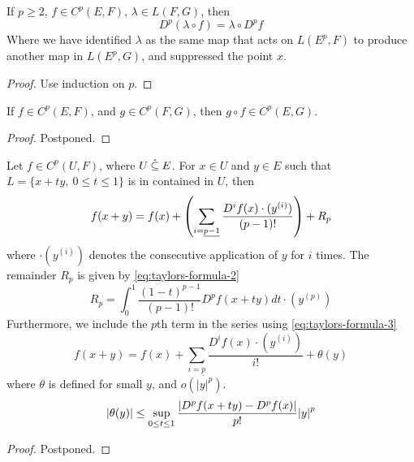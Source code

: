 \documentclass[../main-manifolds.tex]{subfiles}
\begin{document}
\begin{wts}\label{prop:linear-maps-commute-with-p-derivative}
    If $p\geq 2$, $f\in C^p(E,F)$, $\lambda\in L(F,G)$, then
    \[
        D^p(\lambda\circ f) = \lambda\circ D^pf
    \]
    Where we have identified $\lambda$ as the same map that acts on $L(E^p, F)$ to produce another map in $L(E^p, G)$, and suppressed the point $x$.
\end{wts}
\begin{proof}
    Use induction on $p$.
\end{proof}
\begin{wts}\label{prop:Cp-banach-closed-under-composition}
    If $f\in C^p(E,F)$, and $g\in C^p(F,G)$, then $g\circ f\in C^p(E,G)$.
\end{wts}
\begin{proof}
    Postponed.
\end{proof}
\begin{wts}\label{prop:taylors-formula}
    Let $f\in C^p(U, F)$, where $U\:\mathring{\subseteq}\: E$. For $x\in U$ and $y\in E$ such that $L = \{x + ty,\: 0\leq t\leq 1\}$ is in contained in $U$, then 
    \begin{equation}\label{eq:taylors-formula-1}
        f(x+y) = f(x) + \qty(\sum_{i=\underline{p-1}}\dfrac{D^if(x)\cdot (y^{(i)})}{(p-1)!}) + R_p
    \end{equation}
    where $\cdot (y^{(i)})$ denotes the consecutive application of $y$ for $i$ times. The remainder $R_p$ is given by \cref{eq:taylors-formula-2}
    \begin{equation}\label{eq:taylors-formula-2}
        R_p = \int_0^1 \dfrac{(1-t)^{p-1}}{(p-1)!}D^p f(x+ty)dt\cdot (y^{(p)})
    \end{equation}
    Furthermore, we include the $p$th term in the series using \cref{eq:taylors-formula-3}
    \begin{equation}\label{eq:taylors-formula-3}
        f(x+y) = f(x) +\sum_{i=\underline{p}}\dfrac{D^if(x)\cdot (y^{(i)})}{i!} + \theta(y)
    \end{equation}
    where $\theta$ is defined for small $y$, and $o(\vert y\vert^p)$. 
    \begin{equation}\label{eq:taylors-formula-4}
        \abs{\theta(y)}\leq\sup_{0\leq t\leq 1}\dfrac{\abs{D^p f(x+ty) - D^p f(x)}}{p!}\abs{y}^p
    \end{equation}
\end{wts}
\begin{proof}
    Postponed.
\end{proof}
\end{document}
